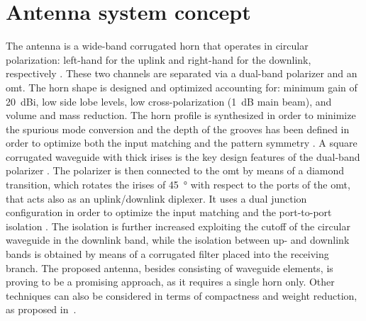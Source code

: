 \documentclass[conference,10pt,a4paper]{IEEEtran}%
\begin{document}
\section{Antenna system concept}
\label{sec:ant-des}
The antenna is a wide-band corrugated horn that operates in circular polarization: left-hand for the uplink and right-hand for the downlink, respectively
.
These two channels are separated via a dual-band polarizer and an \ac{omt}.
The horn shape is designed and optimized accounting for: minimum gain of \SI{20}{dBi}, low side lobe levels, low cross-polarization (\SI{1}{dB} main beam), and volume and mass reduction.
The horn profile is synthesized in order to minimize the spurious mode conversion and the depth of the grooves has been defined in order to optimize both the input matching and the pattern symmetry \cite{Teniente2002}.
A square corrugated waveguide with thick irises is the key design features of the dual-band polarizer \cite{Liu2008}.
The polarizer is then connected to the \ac{omt} by means of a diamond transition, which rotates the irises of \SI{45}{\degree} with respect to the ports of the \ac{omt}, that acts also as an uplink/downlink diplexer.
It uses a dual junction configuration in order to optimize the input matching and the port-to-port isolation \cite{DArcangelo2009}.
The isolation is further increased exploiting the cutoff of the circular waveguide in the downlink band, while the isolation between up- and downlink bands is obtained by means of a corrugated filter placed into the receiving branch.
The proposed antenna, besides consisting of waveguide elements, is proving to be a promising approach, as it requires a single horn only.
Other techniques can also be considered in terms of compactness and weight reduction, as proposed in~\cite{Buttazzoni2017}.


\end{document}
